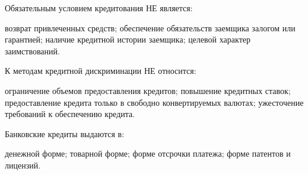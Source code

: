 \documentclass[12pt, table]{exam}
\begin{document}
\begin{questions}
\begin{multicols}{2}
\question Обязательным условием кредитования НЕ является:
	 \begin{choices}
	 \choice возврат привлеченных средств;
	 \choice обеспечение обязательств заемщика залогом или гарантией;
	 \CC наличие кредитной истории заемщика;
	 \choice целевой характер заимствований.
	 \end{choices}
\question К методам кредитной дискриминации НЕ относится:
	 \begin{choices}
	 \choice ограничение объемов предоставления кредитов;
	 \choice повышение кредитных ставок;
	 \CC предоставление кредита только в свободно конвертируемых валютах;
	 \choice ужесточение требований к обеспечению кредита.
	 \end{choices}
\question Банковские кредиты выдаются в:
	 \begin{choices}
	 \CC денежной форме;
	 \choice товарной форме;
	 \choice форме отсрочки платежа;
	 \choice форме патентов и лицензий.
	 \end{choices}



\end{multicols}
\end{questions}
\end{document}
